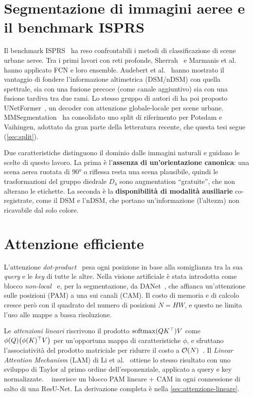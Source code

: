 \section{Segmentazione di immagini aeree e il benchmark ISPRS}
\label{sec:stato-aereo}

Il benchmark ISPRS~\cite{rottensteiner2012isprs} ha reso confrontabili i metodi di
classificazione di scene urbane aeree. Tra i primi lavori con reti profonde,
Sherrah~\cite{sherrah2016fcn} e Marmanis et al.~\cite{marmanis2016ensemble} hanno applicato FCN
e loro ensemble. Audebert et al.~\cite{audebert2018beyond} hanno mostrato il vantaggio di
fondere l'informazione altimetrica (DSM/nDSM) con quella spettrale, sia con una fusione precoce
(come canale aggiuntivo) sia con una fusione tardiva tra due rami. Lo stesso gruppo di autori di
\maresunet{} ha poi proposto UNetFormer~\cite{wang2022unetformer}, un decoder con attenzione
globale-locale per scene urbane. MMSegmentation~\cite{mmseg2020} ha consolidato uno split di
riferimento per Potsdam e Vaihingen, adottato da gran parte della letteratura recente, che questa
tesi segue (\cref{sec:split}).

Due caratteristiche distinguono il dominio dalle immagini naturali e guidano le scelte di
questo lavoro. La prima è l'\textbf{assenza di un'orientazione canonica}: una scena aerea
ruotata di \ang{90} o riflessa resta una scena plausibile, quindi le trasformazioni del gruppo
diedrale $D_4$ sono augmentation \enquote{gratuite}, che non alterano le etichette. La seconda è
la \textbf{disponibilità di modalità ausiliarie} co-registrate, come il DSM e l'nDSM, che
portano un'informazione (l'altezza) non ricavabile dal solo colore.

\section{Attenzione efficiente}
\label{sec:stato-attenzione}

L'attenzione \emph{dot-product}~\cite{vaswani2017attention} pesa ogni posizione in base alla
somiglianza tra la sua \emph{query} e le \emph{key} di tutte le altre. Nella visione artificiale è stata
introdotta come blocco \emph{non-local}~\cite{wang2018nonlocal} e, per la segmentazione, da
DANet~\cite{fu2019danet}, che affianca un'attenzione sulle posizioni (PAM) a una sui canali
(CAM). Il costo di memoria e di calcolo cresce però con il quadrato del numero di posizioni
$N=HW$, e questo ne limita l'uso alle mappe a bassa risoluzione.

Le \emph{attenzioni lineari} riscrivono il prodotto $\operatorname{softmax}(QK^{\top})V$ come $\phi(Q)\bigl(\phi(K)^{\top}
V\bigr)$ per un'opportuna mappa di caratteristiche $\phi$, e sfruttano l'associatività del
prodotto matriciale per ridurre il costo a $\mathcal{O}\!\left(N\right)$~\cite{katharopoulos2020linear}. Il
\emph{Linear Attention Mechanism} (LAM) di Li et al.~\cite{li2020lam} ottiene lo stesso risultato
con uno sviluppo di Taylor al primo ordine dell'esponenziale, applicato a query e key
normalizzate. \maresunet{}~\cite{li2022maresunet} inserisce un blocco PAM lineare + CAM in ogni
connessione di salto di una ResU-Net. La derivazione completa è nella
\cref{sec:attenzione-lineare}.

